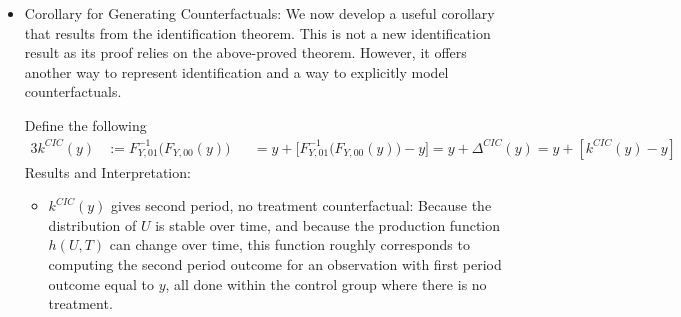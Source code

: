 \documentclass[12pt]{article}
\theoremstyle{plain}
\theoremstyle{definition}
\theoremstyle{remark}
\begin{document}
\begin{itemize}
\begin{proof}
    Next, we want to go from the unobservable to some $t=0$ outcome.
    From the first established result,
    \begin{align*}
      F_{Y,00}(y)
      =
      F_{Y^N,00}(y)
      =
      F_{U,0}\big(h^{-1}(y;0)\big)
      \quad\implies\quad
      F_{Y,00}(h(u;0))
      &=
      F_{U,0}\big(h^{-1}(h(u;0);0)\big)
      =
      F_{U,0}(u)
      \\
      \quad\implies\quad
      h(u;0)
      &=
      F_{Y,00}^{-1}
      \big(
      F_{U,0}(u)
      \big)
    \end{align*}
    Putting together this route from $t=1$ outcome to $t=0$ outcome,
    \begin{align*}
      h(h^{-1}(y;1);0)
      &=
      F_{Y,00}^{-1}
      \big(
      F_{U,0}(h^{-1}(y;1))
      \big)
      \\
      &=
      F_{Y,00}^{-1}
      \big(
      F_{U,0}\big(
        F_{U,0}^{-1}
        \big(
        F_{Y,01}(y)
        \big)
      \big)
      \big)
      \\
      &=
      F_{Y,00}^{-1}
      \big(
        F_{Y,01}(y)
      \big)
    \end{align*}
    Finally,
    \begin{align*}
      F_{Y^N,11}(y)
      &=
      F_{Y,10}(h(h^{-1}(y;1);0);0)
      =
      F_{Y,10}\big(
        F_{Y,00}^{-1}
        \big(
          F_{Y,01}(y)
        \big)
      \big)
    \end{align*}
    \end{proof}

  \item
    Corollary for Generating Counterfactuals:
    We now develop a useful corollary that results from the
    identification theorem.
    This is not a new identification result as its proof relies on the
    above-proved theorem.
    However, it offers another way to represent identification and a way
    to explicitly model counterfactuals.

    Define the following
    \begin{alignat*}{3}
      k^{CIC}(y)
      &:=
      F_{Y,01}^{-1}\big(
        F_{Y,00}(y)
      \big)
      &&=
      y + \big[ F_{Y,01}^{-1}\big( F_{Y,00}(y) \big) - y\big]
      =
      y + \Delta^{CIC}(y)
      =
      y + [k^{CIC}(y)-y]
    \end{alignat*}
    Results and Interpretation:
    \begin{itemize}
      \item $k^{CIC}(y)$ gives second period, no treatment counterfactual:
        Because the distribution of $U$ is stable over time, and because
        the production function $h(U,T)$ can change over time, this
        function roughly corresponds to computing the second period
        outcome for an observation with first period outcome equal to
        $y$, all done within the control group where there is no
        treatment.


\end{itemize}
\end{itemize}
\end{document}

